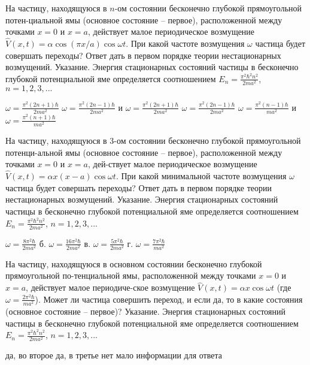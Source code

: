 \documentclass[11pt,a4paper]{exam}
\begin{document}
\begin{questions}
\question На частицу, находящуюся в $n$-ом состоянии бесконечно глубокой прямоугольной потен-циальной ямы (основное состояние – первое), расположенной между точками $x = 0$ и $x = a$, действует малое периодическое возмущение $\hat V(x,t) = \alpha \cos \left( {\pi x/a} \right)\cos \omega t$. При какой частоте возмущения $\omega $ частица будет совершать переходы? Ответ дать в первом порядке теории нестационарных возмущений. Указание. Энергия стационарных состояний частицы в бесконечно глубокой потенциальной яме определяется соотношением ${E_n} = \frac{{{\pi ^2}{\hbar ^2}{n^2}}}{{2m{a^2}}}$, $n = 1,2,3,...$
\begin{choices}
\choice $\omega  = \frac{{{\pi ^2}(2n + 1)\hbar }}{{2m{a^2}}}$      
\choice $\omega  = \frac{{{\pi ^2}(2n - 1)\hbar }}{{2m{a^2}}}$ и $\omega  = \frac{{{\pi ^2}(2n + 1)\hbar }}{{2m{a^2}}}$
\choice $\omega  = \frac{{{\pi ^2}(2n - 1)\hbar }}{{2m{a^2}}}$      
\choice $\omega  = \frac{{{\pi ^2}(n - 1)\hbar }}{{m{a^2}}}$ и $\omega  = \frac{{{\pi ^2}(n + 1)\hbar }}{{m{a^2}}}$
\end{choices}

\question На частицу, находящуюся в 3-ом состоянии бесконечно глубокой прямоугольной потенци-альной ямы (основное состояние – первое), расположенной между точками $x = 0$ и $x = a$, дей-ствует малое периодическое возмущение $\hat V(x,t) = \alpha x(x - a)\cos \omega t$. При какой минимальной частоте возмущения $\omega $ частица будет совершать переходы? Ответ дать в первом порядке теории нестационарных возмущений. Указание. Энергия стационарных состояний частицы в бесконечно глубокой потенциальной яме определяется соотношением ${E_n} = \frac{{{\pi ^2}{\hbar ^2}{n^2}}}{{2m{a^2}}}$, $n = 1,2,3,...$
\begin{choices}
\choice $\omega  = \frac{{8{\pi ^2}\hbar }}{{2m{a^2}}}$    б. $\omega  = \frac{{16{\pi ^2}\hbar }}{{2m{a^2}}}$      в. $\omega  = \frac{{5{\pi ^2}\hbar }}{{2m{a^2}}}$    г. $\omega  = \frac{{7{\pi ^2}\hbar }}{{m{a^2}}}$ 
\end{choices}

\question На частицу, находящуюся в основном состоянии бесконечно глубокой прямоугольной по-тенциальной ямы, расположенной между точками $x = 0$ и $x = a$, действует малое периодиче-ское возмущение $\hat V(x,t) = \alpha x\cos \omega t$ (где $\omega  = \frac{{2{\pi ^2}\hbar }}{{m{a^2}}}$). Может ли частица совершить переход, и если да, то в какие состояния (основное состояние – первое)? Указание. Энергия стационарных состояний частицы в бесконечно глубокой потенциальной яме определяется соотношением ${E_n} = \frac{{{\pi ^2}{\hbar ^2}{n^2}}}{{2m{a^2}}}$, $n = 1,2,3,...$
\begin{choices}
\choice да, во второе  
\choice да, в третье      
\choice нет      
\choice мало информации для ответа
\end{choices}


\end{questions}
\end{document}
